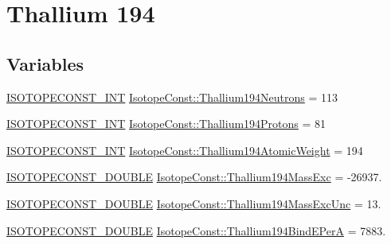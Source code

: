 \hypertarget{group___isotope_const-_thallium-_tl194}{}\section{Thallium 194}
\label{group___isotope_const-_thallium-_tl194}
\subsection*{Variables}
\begin{DoxyCompactItemize}
\item 
\mbox{\hyperlink{group___isotope_const-_macros_ga5f18360b3e99483a35c32d789e62621c}{I\+S\+O\+T\+O\+P\+E\+C\+O\+N\+S\+T\+\_\+\+I\+NT}} \mbox{\hyperlink{group___isotope_const-_thallium-_tl194_gab42f81c098eee35769674c9b6d60cc40}{Isotope\+Const\+::\+Thallium194\+Neutrons}} = 113
\item 
\mbox{\hyperlink{group___isotope_const-_macros_ga5f18360b3e99483a35c32d789e62621c}{I\+S\+O\+T\+O\+P\+E\+C\+O\+N\+S\+T\+\_\+\+I\+NT}} \mbox{\hyperlink{group___isotope_const-_thallium-_tl194_ga6ac91287a86327bf6207a5cc874a7bcc}{Isotope\+Const\+::\+Thallium194\+Protons}} = 81
\item 
\mbox{\hyperlink{group___isotope_const-_macros_ga5f18360b3e99483a35c32d789e62621c}{I\+S\+O\+T\+O\+P\+E\+C\+O\+N\+S\+T\+\_\+\+I\+NT}} \mbox{\hyperlink{group___isotope_const-_thallium-_tl194_ga866cf57a43d851f92523ac2be1e6e445}{Isotope\+Const\+::\+Thallium194\+Atomic\+Weight}} = 194
\item 
\mbox{\hyperlink{group___isotope_const-_macros_ga8f45a7272ce02c0b4c65c44636ed719a}{I\+S\+O\+T\+O\+P\+E\+C\+O\+N\+S\+T\+\_\+\+D\+O\+U\+B\+LE}} \mbox{\hyperlink{group___isotope_const-_thallium-_tl194_ga6fbea5944bfec317a227a56132a3c159}{Isotope\+Const\+::\+Thallium194\+Mass\+Exc}} = -\/26937.
\item 
\mbox{\hyperlink{group___isotope_const-_macros_ga8f45a7272ce02c0b4c65c44636ed719a}{I\+S\+O\+T\+O\+P\+E\+C\+O\+N\+S\+T\+\_\+\+D\+O\+U\+B\+LE}} \mbox{\hyperlink{group___isotope_const-_thallium-_tl194_gaf07c3aed11e538c2bd3bb103d38e0723}{Isotope\+Const\+::\+Thallium194\+Mass\+Exc\+Unc}} = 13.
\item 
\mbox{\hyperlink{group___isotope_const-_macros_ga8f45a7272ce02c0b4c65c44636ed719a}{I\+S\+O\+T\+O\+P\+E\+C\+O\+N\+S\+T\+\_\+\+D\+O\+U\+B\+LE}} \mbox{\hyperlink{group___isotope_const-_thallium-_tl194_ga30fb6a5a714c3d6cc30a66092917921e}{Isotope\+Const\+::\+Thallium194\+Bind\+E\+PerA}} = 7883.
\item 

\end{DoxyCompactItemize}
